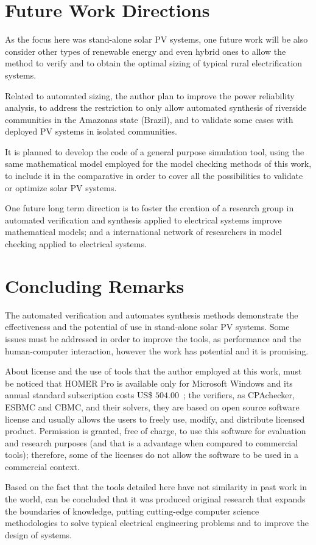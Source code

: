 \section{Future Work Directions}

As the focus here was stand-alone solar PV systems, one future work will be also consider other types of renewable energy and even hybrid ones to allow the method to verify and to obtain the optimal sizing of typical rural electrification systems.

Related to automated sizing, the author plan to improve the power reliability analysis, 
to address the restriction to only allow automated synthesis of riverside communities in the Amazonas state (Brazil), and to validate some cases with deployed PV systems in isolated communities.

It is planned to develop the code of a general purpose simulation tool, using the same mathematical model employed for the model checking methods of this work, to include it in the comparative in order to cover all the possibilities to validate or optimize solar PV systems.

One future long term direction is to foster the creation of a research group in automated verification and synthesis applied to electrical systems improve mathematical models; and a international network of researchers in model checking applied to electrical systems.


\section{Concluding Remarks}

The automated verification and automates synthesis methods demonstrate the effectiveness and the potential of use in stand-alone solar PV systems. Some issues must be addressed in order to improve the tools, as performance and the human-computer interaction, however the work has potential and it is promising.

About license and the use of tools that the author employed at this work, must be noticed that HOMER Pro is available only for Microsoft Windows and its annual standard subscription costs US\$ $504.00$~\cite{HOMER}; the verifiers, as CPAchecker, ESBMC and CBMC, and their solvers, they are  based on open source software license and usually allows the users to freely use, modify, and distribute licensed product. Permission is granted, free of charge, to use this software for evaluation and research purposes (and that is a advantage when compared to commercial tools); therefore, some of the licenses do not allow the software to be used in a commercial context.

Based on the fact that the tools detailed here have not similarity in past work in the world, can be concluded that it was produced original research that expands the boundaries of knowledge, putting cutting-edge computer science methodologies to solve typical electrical engineering problems and to improve the design of systems.



